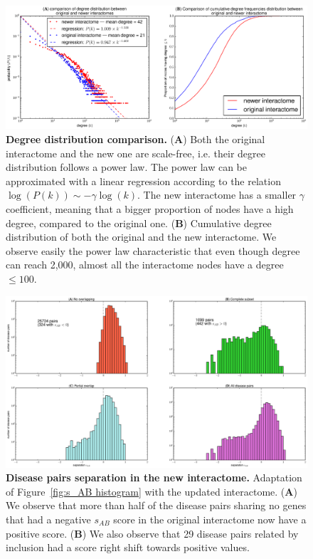 \documentclass[letterpaper]{article}
\begin{document}
	\begin{figure}[!t]
		\hspace{-1.9cm}
		\vspace{-.5cm}
		\includegraphics[scale=.475]{images/degree_distributions_comparison.eps}
		\caption{{\bf Degree distribution comparison.} ({\bf A})  Both the original interactome and the new one
		are scale-free, i.e. their degree distribution follows a power law. The power law can be approximated
		with a linear regression according to the relation $\log(P(k)) \sim -\gamma\log(k)$. The new interactome
		has a smaller $\gamma$ coefficient, meaning that a bigger proportion of nodes have a high degree,
		compared to the original one.
		({\bf B}) Cumulative degree distribution of both the original and the new interactome. We observe
		easily the power law characteristic that even though degree can reach 2,000, almost all the interactome
		nodes have a degree $\leq 100$.
		\label{fig:degree distribution comparison}}
		\vspace{-.5cm}
	\end{figure}

	\begin{figure}[!t]
		\hspace{-2.2cm}
		\vspace{-1cm}
		\includegraphics[scale=.36]{images/new_interactome_s_AB_histogram.eps}
		\caption{{\bf Disease pairs separation in the new interactome.} Adaptation of Figure~\ref{fig:s_AB histogram} with the
		updated interactome.
		({\bf A}) We observe that more than half of the disease pairs sharing no genes that had a negative $s_{AB}$ score
		in the original interactome now have a positive score.
		({\bf B}) We also observe that 29 disease pairs related by inclusion had a score right shift towards positive values.
		\label{fig:new interactome s_AB}}
	\end{figure}
\end{document}
